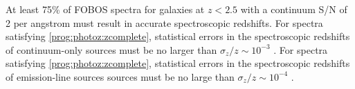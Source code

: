 \documentclass[11pt,a4paper,twoside,onecolumn,openany,final,oldfontcommands]{memoir}
\begin{document}
\medskip
\begin{sciencerequirement}
\reqitem At least 75\% of FOBOS spectra for galaxies at $z<2.5$ with a continuum S/N of 2 per angstrom must result in accurate spectroscopic redshifts. \label{prog:photoz:zcomplete}
\reqitem For spectra satisfying \ref{prog:photoz:zcomplete}, statistical errors in the spectroscopic redshifts of continuum-only sources must be no larger than $\sigma_z/z \sim 10^{-3}$ .
\reqitem For spectra satisfying \ref{prog:photoz:zcomplete}, statistical errors in the spectroscopic redshifts of emission-line sources sources must be no large than $\sigma_z/z \sim 10^{-4}$ .
\end{sciencerequirement}





\end{document}
